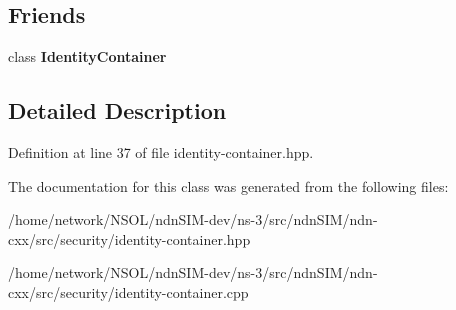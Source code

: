 \subsection*{Friends}
\begin{DoxyCompactItemize}
\item 
class {\bfseries Identity\+Container}\hypertarget{classndn_1_1security_1_1IdentityContainer_1_1const__iterator_ae5d8d658f9d92ad82312b7f52b4c5ef1}{}\label{classndn_1_1security_1_1IdentityContainer_1_1const__iterator_ae5d8d658f9d92ad82312b7f52b4c5ef1}

\end{DoxyCompactItemize}


\subsection{Detailed Description}


Definition at line 37 of file identity-\/container.\+hpp.



The documentation for this class was generated from the following files\+:\begin{DoxyCompactItemize}
\item 
/home/network/\+N\+S\+O\+L/ndn\+S\+I\+M-\/dev/ns-\/3/src/ndn\+S\+I\+M/ndn-\/cxx/src/security/identity-\/container.\+hpp\item 
/home/network/\+N\+S\+O\+L/ndn\+S\+I\+M-\/dev/ns-\/3/src/ndn\+S\+I\+M/ndn-\/cxx/src/security/identity-\/container.\+cpp\end{DoxyCompactItemize}

